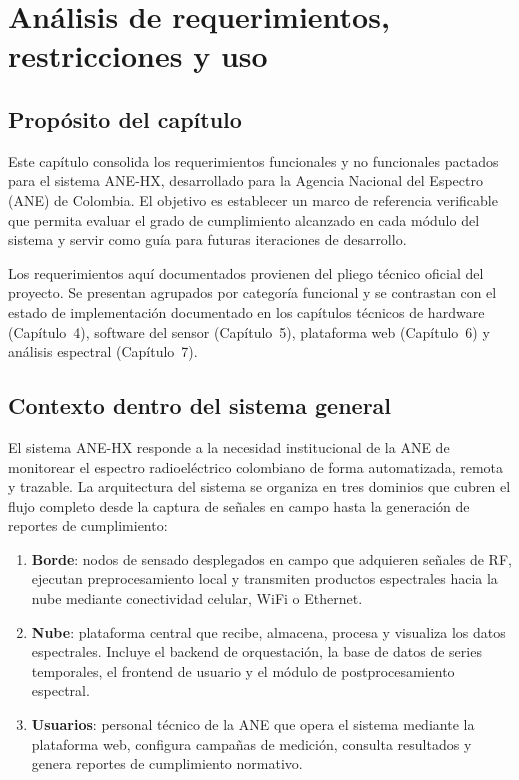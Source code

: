\chapter{Análisis de requerimientos, restricciones y uso}

\section{Propósito del capítulo}

Este capítulo consolida los requerimientos funcionales y no funcionales pactados para el sistema ANE-HX, desarrollado para la Agencia Nacional del Espectro (ANE) de Colombia. El objetivo es establecer un marco de referencia verificable que permita evaluar el grado de cumplimiento alcanzado en cada módulo del sistema y servir como guía para futuras iteraciones de desarrollo.

Los requerimientos aquí documentados provienen del pliego técnico oficial del proyecto. Se presentan agrupados por categoría funcional y se contrastan con el estado de implementación documentado en los capítulos técnicos de hardware (Capítulo~4), software del sensor (Capítulo~5), plataforma web (Capítulo~6) y análisis espectral (Capítulo~7).

\section{Contexto dentro del sistema general}

El sistema ANE-HX responde a la necesidad institucional de la ANE de monitorear el espectro radioeléctrico colombiano de forma automatizada, remota y trazable. La arquitectura del sistema se organiza en tres dominios que cubren el flujo completo desde la captura de señales en campo hasta la generación de reportes de cumplimiento:

\begin{enumerate}[leftmargin=*]
    \item \textbf{Borde}: nodos de sensado desplegados en campo que adquieren señales de RF, ejecutan preprocesamiento local y transmiten productos espectrales hacia la nube mediante conectividad celular, WiFi o Ethernet.
    \item \textbf{Nube}: plataforma central que recibe, almacena, procesa y visualiza los datos espectrales. Incluye el backend de orquestación, la base de datos de series temporales, el frontend de usuario y el módulo de postprocesamiento espectral.
    \item \textbf{Usuarios}: personal técnico de la ANE que opera el sistema mediante la plataforma web, configura campañas de medición, consulta resultados y genera reportes de cumplimiento normativo.
\end{enumerate}

